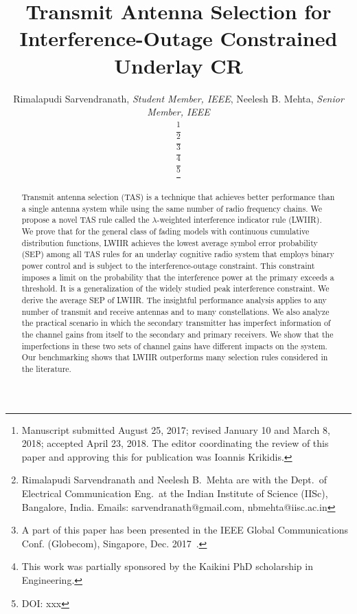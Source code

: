 \documentclass[journal]{IEEEtran}
\newcommand{\lam}{\lambda}
\begin{document}
\title{Transmit Antenna Selection for Interference-Outage Constrained Underlay CR}

\author{Rimalapudi Sarvendranath, {\it Student Member, IEEE}, Neelesh B. Mehta, {\it Senior Member, IEEE}


\thanks{Manuscript submitted August 25, 2017; revised January 10 and March 8, 2018; accepted April 23, 2018. The editor coordinating the review of this paper and approving this for publication was Ioannis Krikidis. }

\thanks{Rimalapudi Sarvendranath and Neelesh B.\ Mehta are with the
		Dept.\ of Electrical Communication Eng.\ at the Indian Institute of
		Science (IISc), Bangalore, India. Emails:
		sarvendranath@gmail.com, nbmehta@iisc.ac.in}
	
\thanks{A part of this paper has been presented in the IEEE Global
		Communications Conf. (Globecom), Singapore, Dec. 2017~\cite{Sarvendranath_2017_globecom}.} 
	
\thanks{This work was partially sponsored by the Kaikini PhD scholarship in Engineering.}

\thanks{DOI: xxx}

}


\setcounter{page}{1}

\maketitle

\begin{abstract}
Transmit antenna selection (TAS) is a technique that achieves better performance than a single
antenna system while using the same number of radio frequency chains. We propose a novel TAS
rule called the $\lam$-weighted interference indicator rule (LWIIR). We prove that for the general class of fading models with continuous cumulative distribution functions, LWIIR achieves the lowest average symbol error probability (SEP) among all TAS rules for  an underlay cognitive radio system that employs binary power control and is subject to the interference-outage constraint. This constraint imposes a limit on the probability that the interference power at the primary exceeds a threshold. It is a generalization of the widely studied peak interference constraint. We derive the average SEP of LWIIR. The insightful performance analysis applies to any number of transmit and receive antennas and to many constellations.  We also analyze the practical scenario in which the secondary transmitter has imperfect information of the channel gains from itself to the secondary and primary receivers. We show that the imperfections in these two sets of channel gains have different impacts on the system. Our benchmarking shows that LWIIR outperforms many selection rules considered in the literature.
\end{abstract}
\end{document}
